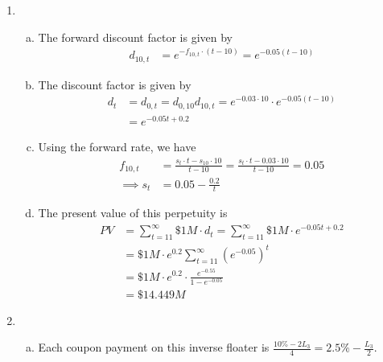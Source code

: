 \documentclass{article}
\begin{document}
\begin{enumerate}[1.]
	\item 
		\begin{enumerate}[(a)]
			\item 
				\begin{soln}
					The forward discount factor is given by
					\begin{align*}
						d_{10, t} &= e^{-f_{10, t}\cdot(t-10)} = \boxed{e^{-0.05(t-10)}}
					\end{align*}
				\end{soln}

			\item 
				\begin{soln}
					The discount factor is given by
					\begin{align*}
						d_t&=d_{0, t} = d_{0, 10} d_{10, t} = e^{-0.03\cdot 10} \cdot e^{-0.05(t-10)} \\
						&= \boxed{e^{-0.05t+0.2}}
					\end{align*}
				\end{soln}

			\item 
				\begin{soln}
					Using the forward rate, we have
					\begin{align*}
						f_{10, t} &= \frac{s_t\cdot t - s_{10}\cdot 10}{t-10} = \frac{s_t\cdot t - 0.03\cdot 10}{t-10} = 0.05 \\
						\implies s_t &= \boxed{0.05 - \frac{0.2}{t}}
					\end{align*}
				\end{soln}

			\item 
				\begin{soln}
					The present value of this perpetuity is
					\begin{align*}
						PV &= \sum_{t=11}^{\infty} \$1M\cdot d_t = \sum_{t=11}^{\infty} \$1M\cdot e^{-0.05t+0.2} \\
						&= \$1M\cdot e^{0.2} \sum_{t=11}^{\infty} (e^{-0.05})^t \\
						&= \$1M\cdot e^{0.2} \cdot \frac{e^{-0.55}}{1-e^{-0.05}} \\
						&= \boxed{\$14.449M}
					\end{align*}
				\end{soln}
				
		\end{enumerate}

	\item 
		\begin{enumerate}[(a)]
			\item 
				\begin{soln}
					Each coupon payment on this inverse floater is $\frac{10\%-2L_3}{4} = 2.5\% - \frac{L_3}{2}.$ 


\end{soln}
\end{enumerate}
\end{enumerate}
\end{document}
